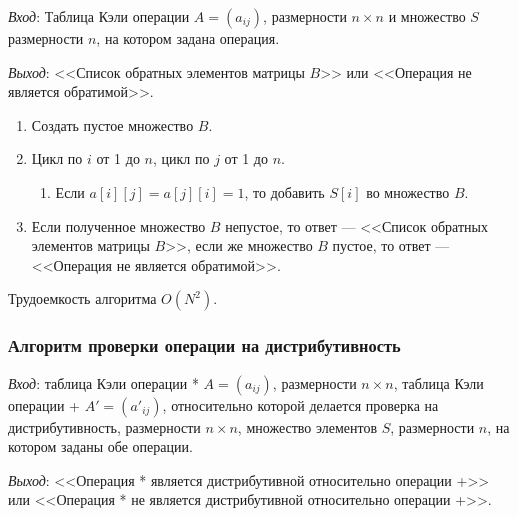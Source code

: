 \documentclass[bachelor, och, labwork]{shiza}
\begin{document}
\textit{Вход}: Таблица Кэли операции $A=(a_{ij})$, размерности $n\times n$ и
множество $S$ размерности $n$, на котором задана операция.

\textit{Выход}: <<Список обратных элементов матрицы $B$>> или <<Операция не является
обратимой>>.

\begin{enumerate}
    \item Создать пустое множество $B$.
    \item Цикл по $i$ от 1 до $n$, цикл по $j$ от 1 до $n$.
        \begin{enumerate}
            \item Если $a[i][j] = a[j][i] = 1$, то добавить $S[i]$ во множество
            $B$.
        \end{enumerate}
    \item Если полученное множество $B$ непустое, то ответ --- <<Список обратных 
    элементов матрицы $B$>>, если же множество $B$ пустое, то ответ --- <<Операция 
    не является обратимой>>.
\end{enumerate}

Трудоемкость алгоритма $O(N^2)$.

\subsubsection{Алгоритм проверки операции на дистрибутивность}

\textit{Вход}: таблица Кэли операции * $A = (a_{ij})$, размерности $n \times n$, 
таблица Кэли операции + $A' = (a'_{ij})$, относительно которой делается проверка 
на дистрибутивность, размерности $n \times n$, множество элементов $S$, размерности 
$n$, на котором заданы обе операции.

\textit{Выход}: <<Операция * является дистрибутивной относительно операции +>> или 
<<Операция * не является дистрибутивной относительно операции +>>.
\end{document}
